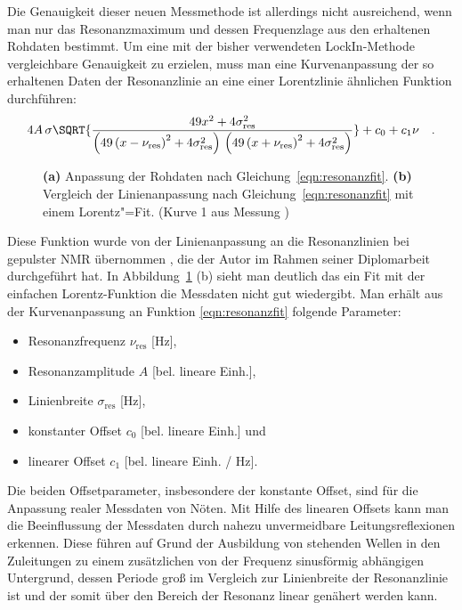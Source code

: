 Die Genauigkeit dieser neuen Messmethode ist allerdings nicht ausreichend, wenn man nur das Resonanzmaximum und dessen Frequenzlage aus den erhaltenen Rohdaten bestimmt. Um eine mit der bisher verwendeten LockIn-Methode vergleichbare Genauigkeit zu erzielen, muss man eine Kurvenanpassung der so erhaltenen Daten der Resonanzlinie an eine einer Lorentzlinie ähnlichen Funktion durchführen:
\begin{equation}
	4A\,\sigma\SQRT{\frac{49x^2 + 4\sigma_\text{res}^2}
	{\left(49\left(x-\nu_\text{res}\right)^2+4\sigma_\text{res}^2\right)
	\,\left(49\left(x+\nu_\text{res}\right)^2+4\sigma_\text{res}^2\right)}}
	+c_0+c_1\nu\quad.
	\label{eqn:resonanzfit}
\end{equation}
\begin{figure}[h!tbp]
	\centerline{%
	}%
	\caption[Linienanpassung an die Messdaten der Resonanzkurven]{{\bfseries (a)} Anpassung der Rohdaten nach Gleichung~\eqref{eqn:resonanzfit}. {\bfseries (b)} Vergleich der Linienanpassung nach Gleichung~\eqref{eqn:resonanzfit} mit einem Lorentz"=Fit. (Kurve 1 aus Messung )}
	\label{fig:fitvergleich}
\end{figure}
Diese Funktion wurde von der Linienanpassung an die Resonanzlinien bei gepulster NMR übernommen \cite{girgl}, die der Autor im Rahmen seiner Diplomarbeit durchgeführt hat. In Abbildung~\ref{fig:fitvergleich} (b) sieht man deutlich das ein Fit mit der einfachen Lorentz-Funktion die Messdaten nicht gut wiedergibt.
Man erhält aus der Kurvenanpassung an Funktion \eqref{eqn:resonanzfit} folgende Parameter:
\begin{itemize}
    \item Resonanzfrequenz $\nu_\text{res}$ [Hz],
    \item Resonanzamplitude $A$ [bel. lineare Einh.],
    \item Linienbreite $\sigma_\text{res}$ [Hz],
    \item konstanter Offset $c_0$ [bel. lineare Einh.] und
    \item linearer Offset $c_1$ [bel. lineare Einh. / Hz].
\end{itemize}
Die beiden Offsetparameter, insbesondere der konstante Offset, sind für die Anpassung realer Messdaten von Nöten. Mit Hilfe des linearen Offsets kann man die Beeinflussung der Messdaten durch nahezu unvermeidbare Leitungsreflexionen erkennen. Diese führen auf Grund der Ausbildung von stehenden Wellen in den Zuleitungen zu einem zusätzlichen von der Frequenz sinusförmig abhängigen Untergrund, dessen Periode groß im Vergleich zur Linienbreite der Resonanzlinie ist und der somit über den Bereich der Resonanz linear genähert werden kann. 

